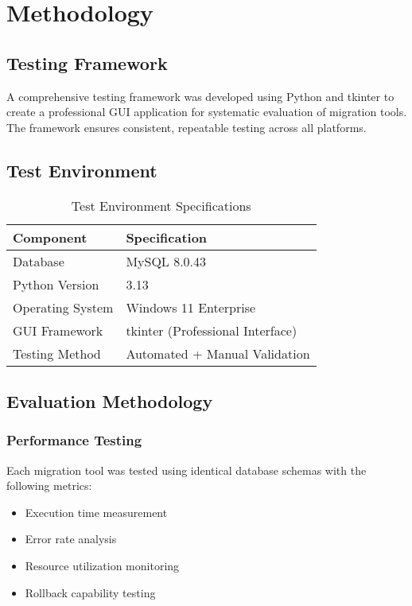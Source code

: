 \section{Methodology}

\subsection{Testing Framework}
A comprehensive testing framework was developed using Python and tkinter to create a professional GUI application for systematic evaluation of migration tools. The framework ensures consistent, repeatable testing across all platforms.

\subsection{Test Environment}
\begin{table}[H]
    \centering
    \begin{tabular}{@{}ll@{}}
        \toprule
        \textbf{Component} & \textbf{Specification} \\
        \midrule
        Database & MySQL 8.0.43 \\
        Python Version & 3.13 \\
        Operating System & Windows 11 Enterprise \\
        GUI Framework & tkinter (Professional Interface) \\
        Testing Method & Automated + Manual Validation \\
        \bottomrule
    \end{tabular}
    \caption{Test Environment Specifications}
    \label{tab:test_env}
\end{table}

\subsection{Evaluation Methodology}

\subsubsection{Performance Testing}
Each migration tool was tested using identical database schemas with the following metrics:
\begin{itemize}
    \item Execution time measurement
    \item Error rate analysis
    \item Resource utilization monitoring
    \item Rollback capability testing
\end{itemize}

